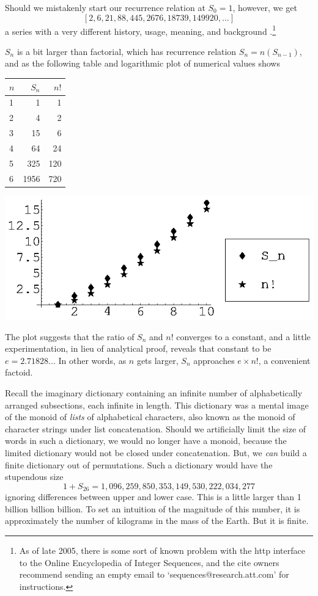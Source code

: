 Should we mistakenly start our recurrence relation at $S_0=1$, however, we get
$$[2, 6, 21, 88, 445, 2676, 18739, 149920, \ldots]$$
a series with a very different history, usage, meaning, and background \cite{A40}.\footnote{As of late 2005, there is some sort of known problem with the http interface to the Online Encyclopedia of Integer Sequences, and the cite owners recommend sending an empty email to `sequences@research.att.com' for instructions.}


$S_n$ is a bit larger than factorial, which has recurrence relation $S_n=n(S_{n-1})$, and as the following table and logarithmic plot of numerical values shows
\begin{center}
\begin{tabular}{lrr}
$n$ & $S_n$ & $n!$ \\
\hline
1 & 1 & 1 \\
2 & 4 & 2 \\
3 & 15 & 6 \\
4 & 64 & 24 \\
5 & 325 & 120 \\
6 & 1956 & 720 \\
\end{tabular}
\end{center}


\begin{center}
\includegraphics{Perms_gr1.eps}
\end{center}


The plot suggests that the ratio of $S_n$ and $n!$ converges to a constant, and a little experimentation, in lieu of analytical proof, reveals that constant to be $e=2.71828...$ In other words, as $n$ gets larger, $S_n$ approaches $e\times n!$, a convenient factoid.


Recall the imaginary dictionary containing an infinite number of alphabetically arranged subsections, each infinite in length. This dictionary was a mental image of the monoid of \emph{lists} of alphabetical characters, also known as the monoid of character strings under list concatenation.  Should we artificially limit the size of words in such a dictionary, we would no longer have a monoid, because the limited dictionary would not be closed under concatenation. But, we \emph{can} build a finite dictionary out of permutations. Such a dictionary would have the stupendous size $$1+S_{26}=1,096,259,850,353,149,530,222,034,277$$
ignoring differences between upper and lower case. This is a little larger than 1 billion billion billion. To set an intuition of the magnitude of this number, it is approximately the number of kilograms in the mass of the Earth. But it is finite.


